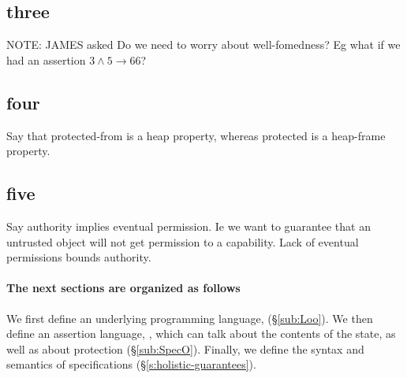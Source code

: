 \subsection{three}
NOTE: JAMES asked Do we need to worry about well-fomedness? Eg what if
we had an assertion $3 \wedge 5 \rightarrow 66$?

  

\subsection{four}
Say that protected-from is a heap property, whereas protected is a
heap-frame property.


\subsection{five}
Say authority implies eventual permission. Ie we want to guarantee that an untrusted object will not get permission to a capability. Lack of eventual permissions bounds authority.


\paragraph{The next sections are organized as follows}
\label{s:semantics}
We first define an underlying programming language, \LangOO (\S \ref{sub:Loo}).
We then define an assertion language, \AssertLang, which can talk about the
contents of the state, as well as about protection (\S \ref{sub:SpecO}).  Finally, we define the syntax and
semantics of  \SpecLang
specifications (\S \ref{s:holistic-guarantees}).

 

